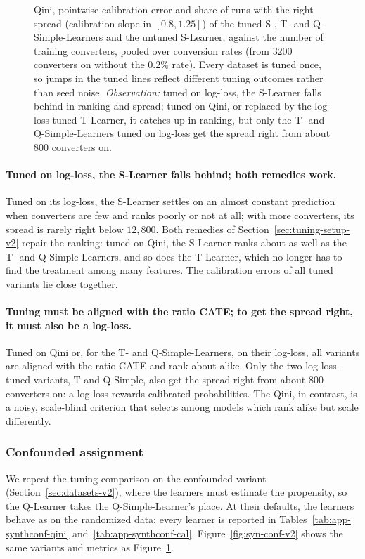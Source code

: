 \documentclass{article}
\begin{document}
\begin{figure}[H]
\centering
{}
\caption{Qini, pointwise calibration error and share of runs with the right
spread (calibration slope in $[0.8, 1.25]$) of the tuned S-, T- and
Q-Simple-Learners and the untuned S-Learner, against the number of training converters, pooled over
conversion rates (from $3200$ converters on without the $0.2\%$ rate). Every
dataset is tuned once, so jumps in the tuned lines reflect different tuning
outcomes rather than seed noise. \emph{Observation:} tuned on log-loss, the
S-Learner falls behind in ranking and spread; tuned on Qini, or replaced by the
log-loss-tuned T-Learner, it catches up in ranking, but only the T- and
Q-Simple-Learners tuned on log-loss get the spread right from about $800$
converters on.}
\label{fig:syn-tuning-main-v2}
\end{figure}

\paragraph{Tuned on log-loss, the S-Learner falls behind; both remedies work.}
Tuned on its log-loss, the S-Learner settles on an almost constant prediction
when converters are few and ranks poorly or not at all; with more
converters, its spread is rarely right below $12{,}800$. Both remedies of
Section~\ref{sec:tuning-setup-v2} repair the ranking: tuned on Qini, the
S-Learner ranks about as well as the T- and Q-Simple-Learners, and so does the
T-Learner, which no longer has to find the treatment among many features. The
calibration errors of all tuned variants lie close together.

\paragraph{Tuning must be aligned with the ratio CATE; to get the spread
right, it must also be a log-loss.}
Tuned on Qini or, for the T- and Q-Simple-Learners, on their log-loss, all
variants are aligned with the ratio CATE and rank about alike. Only the two
log-loss-tuned variants, T and Q-Simple, also get the spread right from about
$800$ converters on: a log-loss
rewards calibrated probabilities. The Qini, in contrast, is a noisy,
scale-blind criterion that selects among models which rank alike but scale
differently.

\subsubsection{Confounded assignment}
\label{sec:syn-conf-v2}
We repeat the tuning comparison on the confounded variant
(Section~\ref{sec:datasets-v2}), where the learners must estimate the
propensity, so the Q-Learner takes the Q-Simple-Learner's place. At their
defaults, the learners behave as on the randomized data; every learner is
reported in Tables~\ref{tab:app-synthconf-qini}
and~\ref{tab:app-synthconf-cal}. Figure~\ref{fig:syn-conf-v2} shows the same
variants and metrics as Figure~\ref{fig:syn-tuning-main-v2}.
\end{document}
